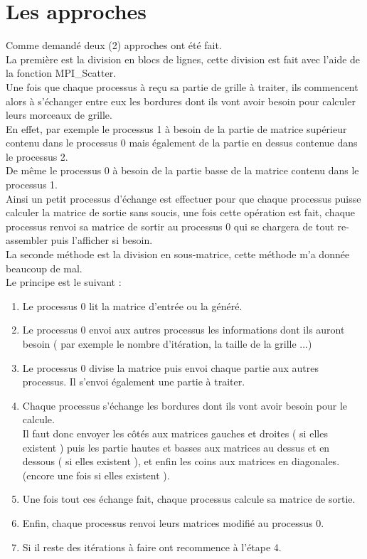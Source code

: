 \documentclass[10pt,a4paper]{article}
\begin{document}
\section{Les approches}
Comme demandé deux (2) approches ont été fait. \\

La première est la division en blocs de lignes, cette division est fait avec l'aide de la fonction MPI\_Scatter. \\
Une fois que chaque processus à reçu sa partie de grille à traiter, ils commencent alors à s'échanger entre eux les bordures dont ils vont avoir besoin pour calculer leurs morceaux de grille. \\
En effet, par exemple le processus 1 à besoin de la partie de matrice supérieur contenu dans le processus 0 mais également de la partie en dessus contenue dans le processus 2. \\
De même le processus 0 à besoin de la partie basse de la matrice contenu dans le processus 1. \\

Ainsi un petit processus d'échange est effectuer pour que chaque processus puisse calculer la matrice de sortie sans soucis, une fois cette opération est fait, chaque processus renvoi sa matrice de sortir au processus 0 qui se chargera de tout re-assembler puis l'afficher si besoin. \\

La seconde méthode est la division en sous-matrice, cette méthode m'a donnée beaucoup de mal. \\
Le principe est le suivant : \\
\begin{enumerate}[(1)]
  \item Le processus 0 lit la matrice d'entrée ou la généré.
  \item Le processus 0 envoi aux autres processus les informations dont ils auront besoin ( par exemple le nombre d'itération, la taille de la grille ...)
  \item Le processus 0 divise la matrice puis envoi chaque partie aux autres processus. Il s'envoi également une partie à traiter.
  \item Chaque processus s'échange les bordures dont ils vont avoir besoin pour le calcule. \\
  Il faut donc envoyer les côtés aux matrices gauches et droites ( si elles existent ) puis les partie hautes et basses aux matrices au dessus et en dessous ( si elles existent ), et enfin les coins aux matrices en diagonales. (encore une fois si elles existent ).
  \item Une fois tout ces échange fait, chaque processus calcule sa matrice de sortie.
  \item Enfin, chaque processus renvoi leurs matrices modifié au processus 0.
  \item Si il reste des itérations à faire ont recommence à l'étape 4.
\end{enumerate}
\end{document}
